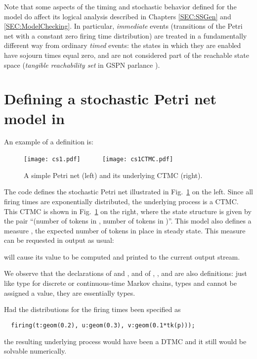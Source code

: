 Note that some aspects of the timing and stochastic behavior defined for the
model do affect its logical analysis described in Chapters \ref{SEC:SSGen}
and \ref{SEC:ModelChecking}.
In particular, \emph{immediate} events (transitions of the Petri net
with a constant zero firing time distribution)
are treated in a fundamentally different way from ordinary
\emph{timed} events: the states in which they are enabled
have sojourn times equal zero, and are not considered part of
the reachable state space (\emph{tangible reachability set} in
GSPN parlance \cite{Ajmone1995book}).



\section{Defining a stochastic Petri net model in {\smart}} \label{SEC:SPNdef}

An example of a  definition is:
%

%
\begin{figure}
  \centering
  \texttt{[image: cs1.pdf]}
  ~~~~~
  \texttt{[image: cs1CTMC.pdf]}
  \caption{A simple Petri net (left) and its underlying CTMC (right).}
  \label{FIG:cs1}
\end{figure} 
%
The code defines the stochastic Petri net  illustrated
in Fig.~\ref{FIG:cs1} on the left.
Since all firing times are exponentially distributed, the underlying
process is a CTMC.
This CTMC is shown in Fig.~\ref{FIG:cs1} on the right, where the state
structure is given by the pair
``(number of tokens in , number of tokens in )''.
This  model also defines a measure , the
expected number of tokens in place  in steady state.
This measure can be requested in output as usual:
%

%
will cause its value to be computed and printed to the current output stream.

We observe that the declarations of  and , and of ,
, and  are also definitions:
just like type  for discrete or continuous-time Markov chains,
types  and  cannot be assigned a value,
they are essentially  types.

Had the distributions for the firing times been specified as
\begin{lstlisting}
  firing(t:geom(0.2), u:geom(0.3), v:geom(0.1*tk(p)));
\end{lstlisting}
the resulting underlying process would have been a DTMC and it still would
be solvable numerically.

